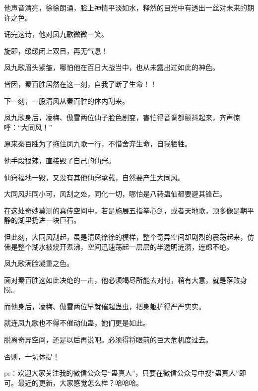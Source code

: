 \begin{this_body}
他声音清亮，徐徐朗诵，脸上神情平淡如水，释然的目光中有透出一丝对未来的期许之色。

诵完这诗，他对凤九歌微微一笑。

旋即，缓缓闭上双目，再无气息！

凤九歌眉头紧皱，哪怕他在百日大战当中，也从未露出过如此的神色。

皆因，秦百胜居然在这一刻，自我了断了生命！！

下一刻，一股清风从秦百胜的体内刮来。

凤九歌身后，凌梅、傲雪两位仙子脸色剧变，害怕得音调都颤抖起来，齐声惊呼：“大同风！”

原来秦百胜为了拖住凤九歌一行，不惜舍弃生命，自我牺牲。

他手段狠辣，直接毁了自己的仙窍。

仙窍福地一毁，又没有其他仙窍承载，自然要产生大同风。

大同风非同小可，风刮之处，同化一切，哪怕是八转蛊仙都要避其锋芒。

在这处奇妙莫测的真传空间中，若是施展五指拳心剑，或者天地歌，顶多像是朝平静的湖里扔进一块巨石。

但此刻，大同风刮起，虽是清风徐徐的模样，整个奇异空间却剧烈的震荡起来，仿佛是整个湖水被烧开煮沸，空间迅速荡起一层层的半透明涟漪，连绵不绝。

凤九歌满脸凝重之色。

面对秦百胜这如此决绝的一击，他必须竭尽所能去对付，稍有大意，就是落败身陨。

而他身后，凌梅、傲雪两位早就催起蛊虫，把身躯护得严严实实。

就连凤九歌也不得不催动仙蛊，她们更是如此。

脱离奇异空间，还是以后再说吧。必须得将眼前的巨大危机度过去。

否则，一切休提！

ps：欢迎大家关注我的微信公众号“蛊真人”，只要在微信公众号中搜“蛊真人”即可。最近的更新，大家感觉怎么样？哈哈哈。

\end{this_body}

